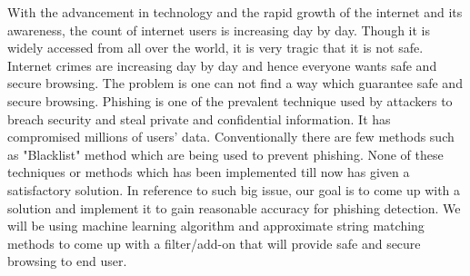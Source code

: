With the advancement in technology and the rapid growth of the internet and its awareness, the count of internet users is increasing day by day. Though it is widely accessed from all over the world, it is very tragic that it is not safe. Internet crimes are increasing day by day and hence everyone wants safe and secure browsing. The problem is one can not find a way which guarantee safe and secure browsing. Phishing is one of the prevalent technique used by attackers to breach security and steal private and confidential information. It has compromised millions of users' data. Conventionally there are few methods such as "Blacklist" method which are being used to prevent phishing. None of these techniques or methods which has been implemented till now has given a satisfactory solution. In reference to such big issue, our goal is to come up with a solution and implement it to gain reasonable accuracy for phishing detection. We will be using machine learning algorithm and approximate string matching methods to come up with a filter/add-on that will provide safe and secure browsing to end user.
